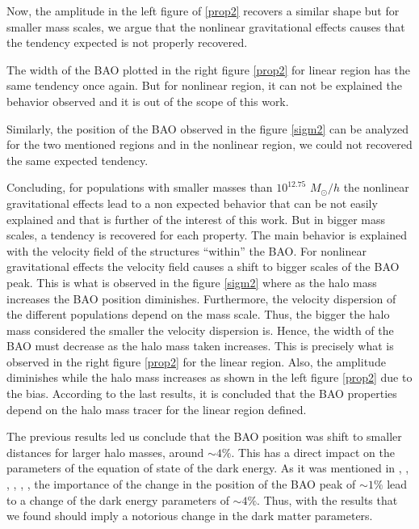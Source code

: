 Now, the amplitude in the left figure of \ref{prop2} recovers a similar shape but
for smaller mass scales, we argue that the nonlinear gravitational effects causes that the tendency
expected is not properly recovered. 	

The width of the BAO plotted in the right figure \ref{prop2} for linear region has the 
same tendency once again. But for nonlinear region, it can not be explained the behavior 
observed and it is out of the scope of this work.

Similarly, the position of the BAO observed in the figure \ref{sigm2} can be analyzed
for the two mentioned regions and in the nonlinear region, we could not recovered the 
same expected tendency. 

Concluding, for populations with smaller masses than $10^{12.75}$ $M_{\odot}/h$ the nonlinear gravitational
effects lead to a non expected behavior that can be not easily explained and that is further
of the interest of this work. But in bigger mass scales, a tendency is recovered for each
property. The main behavior is explained with the velocity field of the structures ``within'' the
BAO. For nonlinear gravitational effects the velocity field causes a shift to bigger scales 
of the BAO peak. This is what is observed in the figure \ref{sigm2} where as the halo mass 
increases the BAO position diminishes. Furthermore, the velocity dispersion of the different
populations depend on the mass scale. Thus, the bigger the halo mass considered the smaller
the velocity dispersion is. Hence, the width of the BAO must decrease as the halo mass taken
increases. This is precisely what is observed in the right figure \ref{prop2} for the linear region. 
Also, the amplitude diminishes while the halo mass increases as shown in the left 
figure \ref{prop2} due to the bias. 
According to the last results, it is concluded that the BAO properties depend on the 
halo mass tracer for the linear region defined. 

The previous results led us conclude that the BAO position was shift to smaller distances
for larger halo masses, around $\sim 4\%$. This has a direct impact on the parameters of the 
equation of state of the dark energy. As it was mentioned in \cite{motion}, \cite{uno}, \cite{dos}, \cite{tres}, \cite{cuatro}, \cite{crocce}, the importance of the change in the position of the 
BAO peak of $\sim 1\%$ lead to a change of the dark energy parameters of $\sim 4\%$. Thus, with 
the results that we found should imply a notorious change in the dark matter parameters. 



